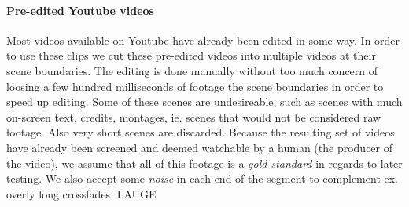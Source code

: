 \paragraph{Pre-edited Youtube videos}
%
Most videos available on Youtube have already been edited in some way. 
In order to use these clips we cut these pre-edited videos into multiple videos at their scene boundaries. The editing is done manually without too much concern of loosing a few hundred milliseconds of footage the scene boundaries in order to speed up editing. Some of these scenes are undesireable, such as scenes with much on-screen text, credits, montages, ie. scenes that would not be considered raw footage. Also very short scenes are discarded. Because the resulting set of videos have already been screened and deemed watchable by a human (the producer of the video), we assume that all of this footage is a \textit{gold standard} in regards to later testing.
%
We also accept some \textit{noise} in each end of the segment to complement ex. overly long crossfades. LAUGE %
%
